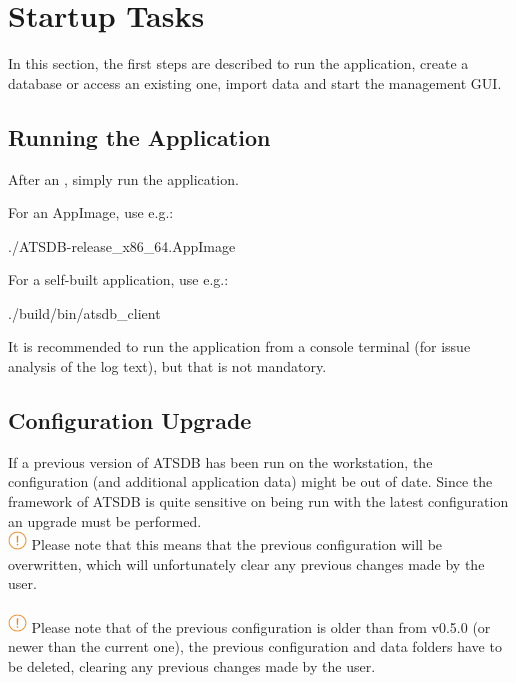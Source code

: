 \chapter{Startup Tasks}
\label{sec:tasks} 

In this section, the first steps are described to run the application, create a database or access an existing one, import data and start the management GUI.

\section{Running the Application}

After an , simply run the application.

For an AppImage, use e.g.:
\begin{cverbatim}
./ATSDB-release_x86_64.AppImage
\end{cverbatim}

For a self-built application, use e.g.:
\begin{cverbatim}
./build/bin/atsdb_client
\end{cverbatim}

It is recommended to run the application from a console terminal (for issue analysis of the log text), but that is not mandatory.

\section{Configuration Upgrade}

If a previous version of ATSDB has been run on the workstation, the configuration (and additional application data) might be out of date. Since the framework of ATSDB is quite sensitive on being run with the latest configuration an upgrade must be performed. \\

\includegraphics[width=0.5cm]{../../data/icons/hint.png} Please note that this means that the previous configuration will be overwritten, which will unfortunately clear any previous changes made by the user. \\\\

\includegraphics[width=0.5cm]{../../data/icons/hint.png} Please note that of the previous configuration is older than from v0.5.0 (or newer than the current one), the previous configuration and data folders have to be deleted, clearing any previous changes made by the user. \\\\

